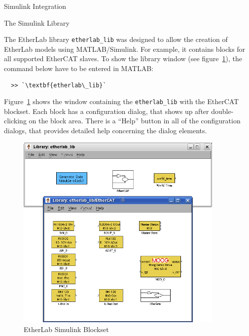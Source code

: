 
\begin{ighsec}{Simulink Integration}
\label{sec:simulink}


\begin{ighsec}{The Simulink Library}
\label{sec:lib}

The EtherLab library \texttt{etherlab\_lib} was designed to allow the creation
of EtherLab models using MATLAB/Simulink. For example, it contains blocks for
all supported EtherCAT slaves. To show the library window (see
figure~\ref{fig:blockset}), the command below have to be entered in
MATLAB:

\begin{lstlisting}
  >> `\textbf{etherlab\_lib}`
\end{lstlisting}

Figure~\ref{fig:blockset} shows the window containing the
\texttt{etherlab\_lib} with the EtherCAT blockset. Each block has a
configuration dialog, that shows up after double-clicking on the block area.
There is a ``Help'' button in all of the configuration dialogs, that provides
detailed help concerning the dialog elements.

\begin{figure}[H]
  \begin{center}
    \includegraphics[width=0.9\textwidth]{images/blockset.png}
    \caption{EtherLab Simulink Blockset}
    \label{fig:blockset}
  \end{center}
\end{figure}


\end{ighsec}
\end{ighsec}
